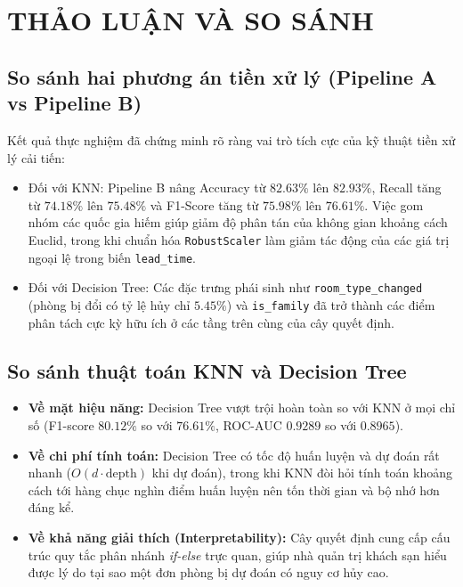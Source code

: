 \chapter{THẢO LUẬN VÀ SO SÁNH}

\section{So sánh hai phương án tiền xử lý (Pipeline A vs Pipeline B)}
Kết quả thực nghiệm đã chứng minh rõ ràng vai trò tích cực của kỹ thuật tiền xử lý cải tiến:
\begin{itemize}
    \item Đối với KNN: Pipeline B nâng Accuracy từ $82.63\%$ lên $82.93\%$, Recall tăng từ $74.18\%$ lên $75.48\%$ và F1-Score tăng từ $75.98\%$ lên $76.61\%$. Việc gom nhóm các quốc gia hiếm giúp giảm độ phân tán của không gian khoảng cách Euclid, trong khi chuẩn hóa \texttt{RobustScaler} làm giảm tác động của các giá trị ngoại lệ trong biến \texttt{lead\_time}.
    \item Đối với Decision Tree: Các đặc trưng phái sinh như \texttt{room\_type\_changed} (phòng bị đổi có tỷ lệ hủy chỉ $5.45\%$) và \texttt{is\_family} đã trở thành các điểm phân tách cực kỳ hữu ích ở các tầng trên cùng của cây quyết định.
\end{itemize}

\section{So sánh thuật toán KNN và Decision Tree}
\begin{itemize}
    \item \textbf{Về mặt hiệu năng:} Decision Tree vượt trội hoàn toàn so với KNN ở mọi chỉ số (F1-score $80.12\%$ so với $76.61\%$, ROC-AUC $0.9289$ so với $0.8965$).
    \item \textbf{Về chi phí tính toán:} Decision Tree có tốc độ huấn luyện và dự đoán rất nhanh ($O(d \cdot \text{depth})$ khi dự đoán), trong khi KNN đòi hỏi tính toán khoảng cách tới hàng chục nghìn điểm huấn luyện nên tốn thời gian và bộ nhớ hơn đáng kể.
    \item \textbf{Về khả năng giải thích (Interpretability):} Cây quyết định cung cấp cấu trúc quy tắc phân nhánh \textit{if-else} trực quan, giúp nhà quản trị khách sạn hiểu được lý do tại sao một đơn phòng bị dự đoán có nguy cơ hủy cao.
\end{itemize}

